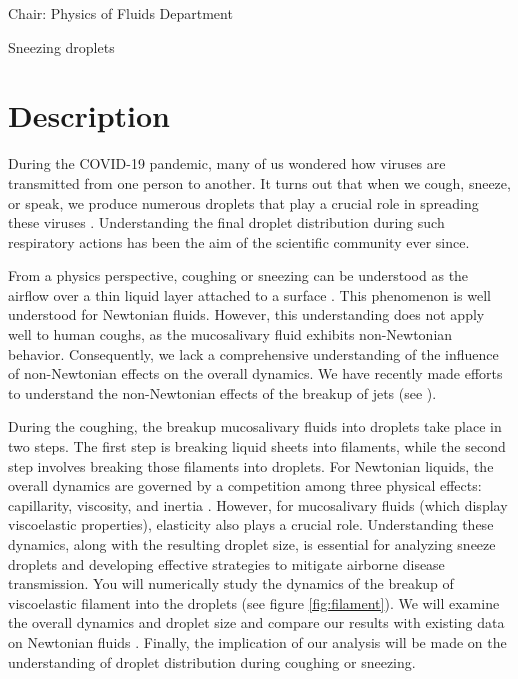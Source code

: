 \documentclass[a4paper,10pt]{article}
\begin{document}
\noindent Chair: Physics of Fluids Department
\begin{center}
 \begin{LARGE}
 Sneezing droplets
   \end{LARGE}
\end{center}
\section*{Description}

During the COVID-19 pandemic, many of us wondered how viruses are transmitted from one person to another. It turns out that when we cough, sneeze, or speak, we produce numerous droplets that play a crucial role in spreading these viruses \citep{bourouiba2021fluid}. Understanding the final droplet distribution during such respiratory actions has been the aim of the scientific community ever since. 

From a physics perspective, coughing or sneezing can be understood as the airflow over a thin liquid layer attached to a surface \citep{kant2023bag}. This phenomenon is well understood for Newtonian fluids. However, this understanding does not apply well to human coughs, as the mucosalivary fluid exhibits non-Newtonian behavior. Consequently, we lack a comprehensive understanding of the influence of non-Newtonian effects on the overall dynamics. We have recently made efforts to understand the non-Newtonian effects of the breakup of jets (see \citet{dixit2024viscoelastic}).   

During the coughing, the breakup mucosalivary fluids into droplets take place in two steps. The first step is breaking liquid sheets into filaments, while the second step involves breaking those filaments into droplets. For Newtonian liquids, the overall dynamics are governed by a competition among three physical effects: capillarity, viscosity, and inertia \citep{anthony2019dynamics}. However, for mucosalivary fluids (which display viscoelastic properties),  elasticity also plays a crucial role\citep{sen2021retraction, liu2022contraction}. Understanding these dynamics, along with the resulting droplet size, is essential for analyzing sneeze droplets and developing effective strategies to mitigate airborne disease transmission.
You will numerically study the dynamics of the breakup of viscoelastic filament into the droplets (see figure \ref{fig:filament}). We will examine the overall dynamics and droplet size and compare our results with existing data on Newtonian fluids \citep{anthony2019dynamics}. Finally, the implication of our analysis will be made on the understanding of droplet distribution during coughing or sneezing. 
\end{document}

